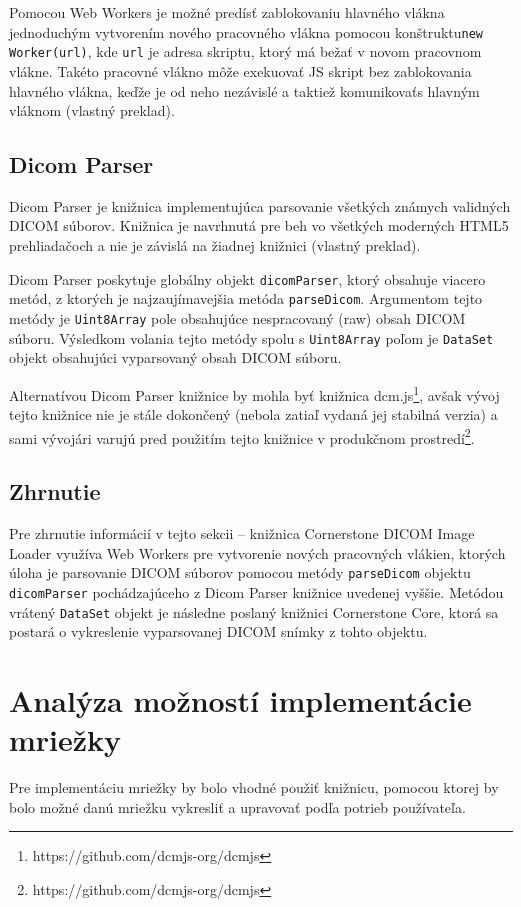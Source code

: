 Pomocou Web Workers je možné predísť zablokovaniu hlavného vlákna jednoduchým vytvorením nového pracovného vlákna pomocou konštruktu\newline \texttt{new Worker(url)}, kde \texttt{url} je adresa skriptu, ktorý má bežať v novom pracovnom vlákne. Takéto pracovné vlákno môže exekuovať JS skript bez zablokovania hlavného vlákna, keďže je od neho nezávislé a taktiež komunikovať\newline s hlavným vláknom \cite{using_web_workers} (vlastný preklad).

\subsection {Dicom Parser}
Dicom Parser je knižnica implementujúca parsovanie všetkých známych validných DICOM súborov. Knižnica je navrhnutá pre beh vo všetkých moderných HTML5 prehliadačoch a nie je závislá na žiadnej knižnici \cite{about_dicom_parser} (vlastný preklad).

Dicom Parser poskytuje globálny objekt \texttt{dicomParser}, ktorý obsahuje viacero metód, z ktorých je najzaujímavejšia metóda \texttt{parseDicom}. Argumentom tejto metódy je \texttt{Uint8Array} pole obsahujúce nespracovaný (raw) obsah DICOM súboru. Výsledkom volania tejto metódy spolu s \texttt{Uint8Array} poľom je \texttt{DataSet} objekt obsahujúci vyparsovaný obsah DICOM súboru.

\clearpage
Alternatívou Dicom Parser knižnice by mohla byť knižnica dcm.js\footnote{https://github.com/dcmjs-org/dcmjs}, avšak vývoj tejto knižnice nie je stále dokončený (nebola zatiaľ vydaná jej stabilná verzia) a sami vývojári varujú pred použitím tejto knižnice v produkčnom prostredí\footnote{https://github.com/dcmjs-org/dcmjs}.

\subsection {Zhrnutie}
Pre zhrnutie informácií v tejto sekcii -- knižnica Cornerstone DICOM Image Loader využíva Web Workers pre vytvorenie nových pracovných vlákien, ktorých úloha je parsovanie DICOM súborov pomocou metódy \texttt{parseDicom} objektu \texttt{dicomParser} pochádzajúceho z Dicom Parser knižnice uvedenej vyššie. Metódou vrátený \texttt{DataSet} objekt je následne poslaný knižnici Cornerstone Core, ktorá sa postará o vykreslenie vyparsovanej DICOM snímky z tohto objektu.

\section {Analýza možností implementácie mriežky}
Pre implementáciu mriežky by bolo vhodné použiť knižnicu, pomocou ktorej by bolo možné danú mriežku vykresliť a upravovať podľa potrieb používateľa.

